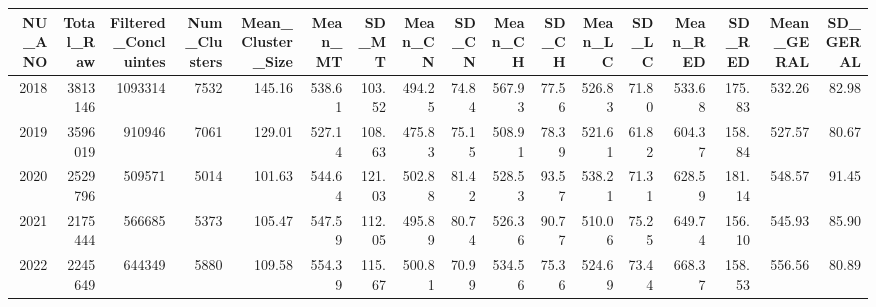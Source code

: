 \begin{tabular}{rrrrrrrrrrrrrrrrr}
\toprule
NU_ANO & Total_Raw & Filtered_Concluintes & Num_Clusters & Mean_Cluster_Size & Mean_MT & SD_MT & Mean_CN & SD_CN & Mean_CH & SD_CH & Mean_LC & SD_LC & Mean_RED & SD_RED & Mean_GERAL & SD_GERAL \\
\midrule
2018 & 3813146 & 1093314 & 7532 & 145.16 & 538.61 & 103.52 & 494.25 & 74.84 & 567.93 & 77.56 & 526.83 & 71.80 & 533.68 & 175.83 & 532.26 & 82.98 \\
2019 & 3596019 & 910946 & 7061 & 129.01 & 527.14 & 108.63 & 475.83 & 75.15 & 508.91 & 78.39 & 521.61 & 61.82 & 604.37 & 158.84 & 527.57 & 80.67 \\
2020 & 2529796 & 509571 & 5014 & 101.63 & 544.64 & 121.03 & 502.88 & 81.42 & 528.53 & 93.57 & 538.21 & 71.31 & 628.59 & 181.14 & 548.57 & 91.45 \\
2021 & 2175444 & 566685 & 5373 & 105.47 & 547.59 & 112.05 & 495.89 & 80.74 & 526.36 & 90.77 & 510.06 & 75.25 & 649.74 & 156.10 & 545.93 & 85.90 \\
2022 & 2245649 & 644349 & 5880 & 109.58 & 554.39 & 115.67 & 500.81 & 70.99 & 534.56 & 75.36 & 524.69 & 73.44 & 668.37 & 158.53 & 556.56 & 80.89 \\
\bottomrule
\end{tabular}

